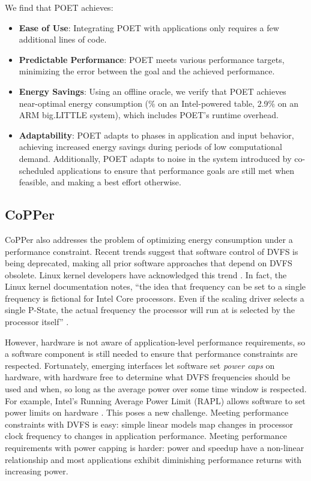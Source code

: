 We find that POET achieves:
\begin{itemize}
\item \textbf{Ease of Use}: Integrating POET with applications only requires a few additional lines of code.
\item \textbf{Predictable Performance}: POET meets various performance targets, minimizing the error between the goal and the achieved performance.
\item \textbf{Energy Savings}: Using an offline oracle, we verify that POET achieves near-optimal energy consumption (\% on an Intel-powered table, 2.9\% on an ARM big.LITTLE system), which includes POET's runtime overhead.
\item \textbf{Adaptability}: POET adapts to phases in application and input behavior, achieving increased energy savings during periods of low computational demand.
Additionally, POET adapts to noise in the system introduced by co-scheduled applications to ensure that performance goals are still met when feasible, and making a best effort otherwise.
\end{itemize}


\subsection{CoPPer}

CoPPer also addresses the problem of optimizing energy consumption under a performance constraint.
Recent trends suggest that software control of DVFS is being deprecated, making all prior software approaches that depend on DVFS obsolete.
Linux kernel developers have acknowledged this trend \cite{lwn602479}.
In fact, the Linux kernel documentation notes, ``the idea that frequency can be set to a single frequency is fictional for Intel Core processors. Even if the scaling driver selects a single P-State, the actual frequency the processor will run at is selected by the processor itself'' \cite{KernelPstate}.

However, hardware is not aware of application-level performance requirements, so a software component is still needed to ensure that performance constraints are respected.
Fortunately, emerging interfaces let software set \emph{power caps} on hardware, with hardware free to determine what DVFS frequencies should be used and when, so long as the average power over some time window is respected.
For example, Intel's Running Average Power Limit (RAPL) allows software to set power limits on hardware \cite{RAPL}.
This poses a new challenge.
Meeting performance constraints with DVFS is easy: simple linear models map changes in processor clock frequency to changes in application performance.
Meeting performance requirements with power capping is harder: power and speedup have a non-linear relationship and most applications exhibit diminishing performance returns with increasing power.

